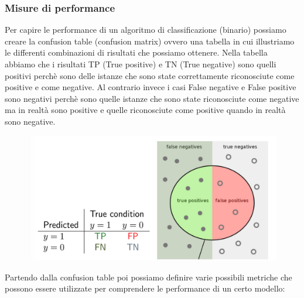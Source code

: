 \documentclass[14pt]{extreport}
\begin{document}
	\subsubsection{Misure di performance}

	Per capire le performance di un algoritmo di classificazione (binario) possiamo creare la confusion table (confusion matrix) ovvero una tabella in cui illustriamo le differenti combinazioni di risultati che possiamo ottenere.
	Nella tabella abbiamo che i risultati TP (True positive) e TN (True negative) sono quelli positivi perchè sono delle istanze che sono state correttamente riconosciute come positive e come negative.
	Al contrario invece i casi False negative e False positive sono negativi perchè sono quelle istanze che sono state riconosciute come negative ma in realtà sono positive e quelle riconosciute come positive quando in realtà sono negative. 
	


	\begin{figure}[H] 
		\centering
		\includegraphics[width=0.7\linewidth]{456.jpeg}
		\end{figure}

Partendo dalla confusion table poi possiamo definire varie possibili metriche che possono essere utilizzate per comprendere le performance di un certo modello:
\end{document}
